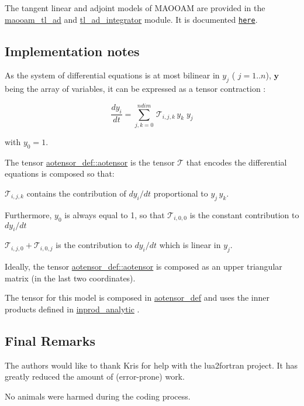 The tangent linear and adjoint models of M\-A\-O\-O\-A\-M are provided in the \hyperlink{classmaooam__tl__ad}{maooam\-\_\-tl\-\_\-ad} and \hyperlink{classtl__ad__integrator}{tl\-\_\-ad\-\_\-integrator} module. It is documented \href{./md_tl_ad_doc.html}{\tt here}. 



\subsection*{Implementation notes}

As the system of differential equations is at most bilinear in $y_j$ ( $j=1..n$), $\boldsymbol{y}$ being the array of variables, it can be expressed as a tensor contraction \-:

\[ \frac{d y_i}{dt} = \sum_{j,k=0}^{ndim} \, \mathcal{T}_{i,j,k} \, y_k \; y_j \]

with $y_0 = 1$.

The tensor \hyperlink{classaotensor__def_a0dc43bc9294a18f2fe57b67489f1702f}{aotensor\-\_\-def\-::aotensor} is the tensor $\mathcal{T}$ that encodes the differential equations is composed so that\-:


\begin{DoxyItemize}
\item $\mathcal{T}_{i,j,k}$ contains the contribution of $dy_i/dt$ proportional to $ y_j \, y_k$.
\item Furthermore, $y_0$ is always equal to 1, so that $\mathcal{T}_{i,0,0}$ is the constant contribution to $dy_i/dt$
\item $\mathcal{T}_{i,j,0} + \mathcal{T}_{i,0,j}$ is the contribution to $dy_i/dt$ which is linear in $y_j$.
\end{DoxyItemize}

Ideally, the tensor \hyperlink{classaotensor__def_a0dc43bc9294a18f2fe57b67489f1702f}{aotensor\-\_\-def\-::aotensor} is composed as an upper triangular matrix (in the last two coordinates).

The tensor for this model is composed in \hyperlink{classaotensor__def}{aotensor\-\_\-def} and uses the inner products defined in \hyperlink{classinprod__analytic}{inprod\-\_\-analytic} . 



\subsection*{Final Remarks}

The authors would like to thank Kris for help with the lua2fortran project. It has greatly reduced the amount of (error-\/prone) work.

No animals were harmed during the coding process. 